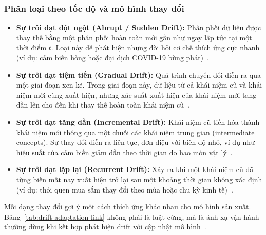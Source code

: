 \subsubsection{Phân loại theo tốc độ và mô hình thay đổi}
\begin{itemize}
    \item \textbf{Sự trôi dạt đột ngột (Abrupt / Sudden Drift):} Phân phối dữ liệu được thay thế bằng một phân phối hoàn toàn mới gần như ngay lập tức tại một thời điểm $t$. Loại này dễ phát hiện nhưng đòi hỏi cơ chế thích ứng cực nhanh (ví dụ: cảm biến hỏng hoặc đại dịch COVID-19 bùng phát)~\cite{basseville1993detection}.
    
    \item \textbf{Sự trôi dạt tiệm tiến (Gradual Drift):} Quá trình chuyển đổi diễn ra qua một giai đoạn xen kẽ. Trong giai đoạn này, dữ liệu từ cả khái niệm cũ và khái niệm mới cùng xuất hiện, nhưng xác suất xuất hiện của khái niệm mới tăng dần lên cho đến khi thay thế hoàn toàn khái niệm cũ~\cite{gama2014survey}.
    
    \item \textbf{Sự trôi dạt tăng dần (Incremental Drift):} Khái niệm cũ tiến hóa thành khái niệm mới thông qua một chuỗi các khái niệm trung gian (intermediate concepts). Sự thay đổi diễn ra liên tục, đơn điệu với biên độ nhỏ, ví dụ như hiệu suất của cảm biến giảm dần theo thời gian do hao mòn vật lý~\cite{hovakimyan2024evolving}.
    
    \item \textbf{Sự trôi dạt lặp lại (Recurrent Drift):} Xảy ra khi một khái niệm cũ đã từng biến mất nay xuất hiện trở lại sau một khoảng thời gian không xác định (ví dụ: thói quen mua sắm thay đổi theo mùa hoặc chu kỳ kinh tế)~\cite{hovakimyan2024evolving}.
\end{itemize}

Mỗi dạng thay đổi gợi ý một cách thích ứng khác nhau cho mô hình sản xuất. Bảng~\ref{tab:drift-adaptation-link} không phải là luật cứng, mà là ánh xạ vận hành thường dùng khi kết hợp phát hiện drift với cập nhật mô hình~\cite{gama2014survey, lu2018learning, celik2020adaptation}.

